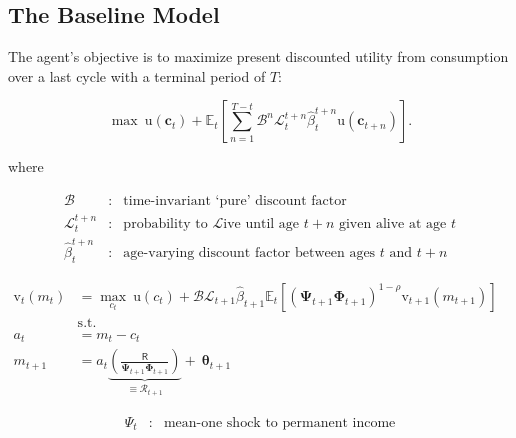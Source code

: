 \documentclass{article}
\newcommand{\DiscFac}{\beta}
\newcommand{\uFunc}{\mathrm{u}}
\newcommand{\Alive}{\mathcal{L}}
\newcommand{\cLvl}{\mathbf{c}}
\newcommand{\Ex}{\mathbb{E}}
\newcommand{\beth}{\mathcal{B}}
\newcommand{\CRRA}{\rho}
\newcommand{\PermGroFac}{\pmb{\Phi}}
\newcommand{\vFunc}{\mathrm{v}}
\newcommand{\Rfree}{\mathsf{R}}
\newcommand{\PermShk}{\mathbf{\Psi}}
\newcommand{\aNrm}{a}
\newcommand{\cNrm}{c}
\newcommand{\RNrm}{\mathcal{R}}
\newcommand{\TranShkEmp}{\pmb{\theta}}
\begin{document}
\subsection{The Baseline Model}\label{The Baseline Model}

The agent's objective is to maximize present discounted utility from consumption over a last cycle with a terminal period of $T$:

\begin{equation}
\label{eq:MaxProb}
\max ~ \uFunc({\cLvl}_{t}) + \Ex_{t}\left[ \sum_{n=1}^{T-t} {\beth}^{n} \Alive_{t}^{t+n}\hat{\DiscFac}_{t}^{t+n} \uFunc({\cLvl}_{t+n})\right].
\end{equation}

where

\begin{equation}
\begin{align}
       \beth &:&\text{time-invariant `pure' discount factor}
       \\ \Alive _{t}^{t+n} & : & \text{probability to }\Alive\text{ive until age $t+n$ given alive at age $t$}
  \\  \hat{\DiscFac}_{t}^{t+n} &:&\text{age-varying discount factor between ages $t$ and $t+n$}
\end{align}
\end{equation}

\begin{equation}
\begin{align}
  {\vFunc}_{t}({m}_{t}) & = \max_{\cNrm_{t}} ~  \uFunc(\cNrm_{t})+\beth\Alive_{t+1}\hat{\DiscFac}_{t+1}
  \Ex_{t}[(\PermShk_{t+1}\PermGroFac_{t+1})^{1-\CRRA}{\vFunc}_{t+1}({m}_{t+1})]                                 \\
                        & \text{s.t.}                                                               & \nonumber \\
  \aNrm_{t}               & = {m}_{t}-\cNrm_{t} \nonumber
  \\  {m}_{t+1}  & = \aNrm_{t}\underbrace{\left(\frac{\Rfree}{\PermShk_{t+1}\PermGroFac_{t+1}}\right)}_{\equiv \RNrm_{t+1}}+ ~\TranShkEmp_{t+1}
\end{align}
\end{equation}

\begin{equation}
\begin{align}
      \Psi_{t} &:&\text{mean-one shock to permanent income}
\end{align}
\end{equation}
\end{document}
